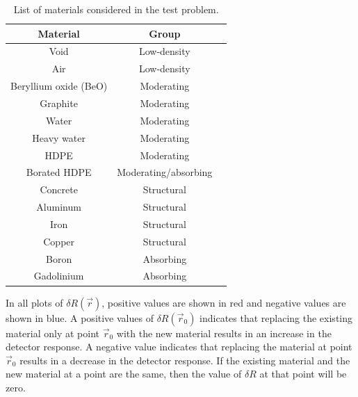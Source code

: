 \begin{table}[h]
  \centering
  \caption{List of materials considered in the test problem.}
  \label{tab:testprob:material_list}
  \begin{tabular}{| c | c | c |}
    \hline
    \textbf{Material}     & \textbf{Group}       \\ \hline
    Void                  & Low-density          \\ \hline  %
    Air                   & Low-density          \\ \hline  %
    Beryllium oxide (BeO) & Moderating           \\ \hline  %
    Graphite              & Moderating           \\ \hline  %
    Water                 & Moderating           \\ \hline  %
    Heavy water           & Moderating           \\ \hline  %
    HDPE                  & Moderating           \\ \hline  %
    Borated HDPE          & Moderating/absorbing \\ \hline  %
    Concrete              & Structural           \\ \hline  %
    Aluminum              & Structural           \\ \hline  %
    Iron                  & Structural           \\ \hline  %
    Copper                & Structural           \\ \hline  %
    Boron                 & Absorbing            \\ \hline  %
    Gadolinium            & Absorbing            \\ \hline  %
  \end{tabular}
\end{table}

In all plots of $\delta R\left(\vec{r}\right)$, positive values are shown in red and negative values are shown in blue.
A positive values of $\delta R\left(\vec{r}_0\right)$ indicates that replacing the existing material only at point $\vec{r}_0$ with the new material results in an increase in the detector response.
A negative value indicates that replacing the material at point $\vec{r}_0$ results in a decrease in the detector response.
If the existing material and the new material at a point are the same, then the value of $\delta R$ at that point will be zero.

